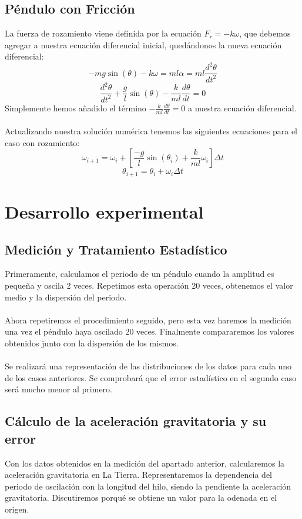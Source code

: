 \documentclass{article}
\begin{document}
\subsection{Péndulo con Fricción}
La fuerza de rozamiento viene definida por la ecuación $F_{r} = -k \omega$, que debemos agregar a nuestra ecuación diferencial inicial, quedándonos la nueva ecuación diferencial: \[ -m g \sin(\theta) - k \omega = m l \alpha = m l \frac{d^2\theta}{dt^2} \] \[\boxed{\frac{d^{2}\theta}{dt^{2}} + \frac{g}{l} \sin(\theta) - \frac{k}{m l} \frac{d\theta}{dt} = 0}\]
Simplemente hemos añadido el término $- \frac{k}{m l} \frac{d\theta}{dt} = 0$ a nuestra ecuación diferencial.\\ \\
Actualizando nuestra solución numérica tenemos las siguientes ecuaciones para el caso con rozamiento:
\[ \boxed{\omega_{i+1} = \omega_{i} + \left[ \frac{-g}{l} \sin(\theta_{i}) + \frac{k}{m l}\omega_{i} \right] \Delta t}\]
\[ \boxed{\theta_{i+1} = \theta_{i} + \omega_{i} \Delta t}\]


\section{Desarrollo experimental}
\subsection{Medición y Tratamiento Estadístico}
Primeramente, calculamos el periodo de un péndulo cuando la amplitud es pequeña y oscila 2 veces. Repetimos esta operación 20 veces, obtenemos el valor medio y la dispersión del periodo. \\\\ 
Ahora repetiremos el procedimiento seguido, pero esta vez haremos la medición una vez el péndulo haya oscilado 20 veces. Finalmente compararemos los valores obtenidos junto con la dispersión de los mismos. \\\\
Se realizará una representación de las distribuciones de los datos para cada uno de los casos anteriores. Se comprobará que el error estadístico en el segundo caso será mucho menor al primero.

\subsection{Cálculo de la aceleración gravitatoria y su error}
Con los datos obtenidos en la medición del apartado anterior, calcularemos la aceleración gravitatoria en La Tierra. Representaremos la dependencia del periodo de oscilación con la longitud del hilo, siendo la pendiente la aceleración gravitatoria. Discutiremos porqué se obtiene un valor para la odenada en el origen.  
\end{document}
